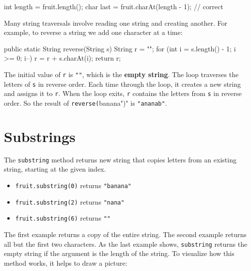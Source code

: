 \documentclass[12pt]{book}
\theoremstyle{exercise}
\newcommand{\java}[1]{\verb"#1"}
\begin{document}

\begin{code}
    int length = fruit.length();
    char last = fruit.charAt(length - 1);  // correct
\end{code}

Many string traversals involve reading one string and creating another.
For example, to reverse a string we add one character at a time:

\begin{code}
    public static String reverse(String s) {
        String r = "";
        for (int i = s.length() - 1; i >= 0; i--) {
            r = r + s.charAt(i);
        }
        return r;
    }
\end{code}


The initial value of \java{r} is \verb|""|, which is the {\bf empty string}.
The loop traverses the letters of \java{s} in reverse order.
Each time through the loop, it creates a new string and assigns it to \java{r}.
When the loop exits, \java{r} contains the letters from \java{s} in reverse order.
So the result of \java{reverse("banana")} is \verb|"ananab"|.


\section{Substrings}

The \java{substring} method returns new string that copies letters from an existing string, starting at the given index.

\begin{itemize}
\item \java{fruit.substring(0)} returns \verb|"banana"|
\item \java{fruit.substring(2)} returns \verb|"nana"|
\item \java{fruit.substring(6)} returns \verb|""|
\end{itemize}

The first example returns a copy of the entire string.
The second example returns all but the first two characters.
As the last example shows, \java{substring} returns the empty string if the argument is the length of the string.
To visualize how this method works, it helps to draw a picture:

\end{document}
